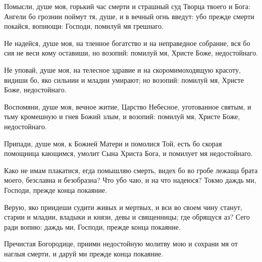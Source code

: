 \begin{mymulticols}
Помысли, душе моя, горький час смерти и страшный суд Творца твоего и Бога: Ангели бо грознии поймут тя, душе, и в вечный огнь введут: убо прежде смерти покайся, вопиющи: Господи, помилуй мя грешнаго.




Не надейся, душе моя, на тленное богатство и на неправедное собрание, вся бо сия не веси кому оставиши, но возопий: помилуй мя, Христе Боже, недостойнаго.


Не уповай, душе моя, на телесное здравие и на скоромимоходящую красоту, видиши бо, яко сильнии и младии умирают; но возопий: помилуй мя, Христе Боже, недостойнаго.

\slava

Воспомяни, душе моя, вечное житие, Царство Небесное, уготованное святым, и тьму кромешную и гнев Божий злым, и возопий: помилуй мя, Христе Боже, недостойнаго.

\inyne

Припади, душе моя, к Божией Матери и помолися Той, есть бо скорая помощница кающимся, умолит Сына Христа Бога, и помилует мя недостойнаго.




Како не имам плакатися, егда помышляю смерть, видех бо во гробе лежаща брата моего, безславна и безобразна? Что убо чаю, и на что надеюся? Токмо даждь ми, Господи, прежде конца покаяние. 

\slava

Верую, яко приидеши судити живых и мертвых, и вси во своем чину станут, старии и младии, владыки и князи, девы и священницы; где обрящуся аз? Сего ради вопию: даждь ми, Господи, прежде конца покаяние.

\inyne

Пречистая Богородице, приими недостойную молитву мою и сохрани мя от наглыя смерти, и даруй ми прежде конца покаяние.


\end{mymulticols}
